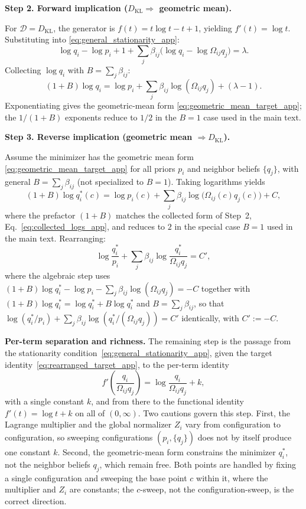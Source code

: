 \documentclass[11pt]{article}
\begin{document}
\textbf{Step 2. Forward implication ($D_{\mathrm{KL}}\Rightarrow$ geometric mean).}

For $\mathcal{D}=D_{\mathrm{KL}}$, the generator is $f(t)=t\log t - t + 1$, yielding $f'(t)=\log t$. Substituting into \eqref{eq:general_stationarity_app}:
\[
\log q_i - \log p_i + 1 + \sum_j \beta_{ij}\bigl(\log q_i - \log\Omega_{ij}q_j\bigr) = \lambda.
\]
Collecting $\log q_i$ with $B = \sum_j \beta_{ij}$:
\begin{equation}
(1+B)\log q_i = \log p_i + \sum_j\beta_{ij}\log(\Omega_{ij}q_j) + (\lambda - 1).
\label{eq:collected_logs_app}
\end{equation}
Exponentiating gives the geometric-mean form \eqref{eq:geometric_mean_target_app}; the $1/(1+B)$ exponents reduce to $1/2$ in the $B = 1$ case used in the main text.

\textbf{Step 3. Reverse implication (geometric mean $\Rightarrow D_{\mathrm{KL}}$).}

Assume the minimizer has the geometric mean form \eqref{eq:geometric_mean_target_app} for all priors $p_i$ and neighbor beliefs $\{q_j\}$, with general $B = \sum_j \beta_{ij}$ (not specialized to $B = 1$). Taking logarithms yields
\begin{equation}
(1+B)\log q_i^*(c) = \log p_i(c) + \sum_j\beta_{ij}\log\bigl(\Omega_{ij}(c)q_j(c)\bigr) + C,
\end{equation}
where the prefactor $(1+B)$ matches the collected form of Step~2, Eq.~\eqref{eq:collected_logs_app}, and reduces to $2$ in the special case $B = 1$ used in the main text. Rearranging:
\begin{equation}
\log\frac{q_i^*}{p_i} + \sum_j\beta_{ij}\log\frac{q_i^*}{\Omega_{ij}q_j} = C',
\label{eq:rearranged_target_app}
\end{equation}
where the algebraic step uses $(1+B)\log q_i^* - \log p_i - \sum_j\beta_{ij}\log(\Omega_{ij}q_j) = -C$ together with $(1+B)\log q_i^* = \log q_i^* + B\log q_i^*$ and $B = \sum_j\beta_{ij}$, so that $\log(q_i^*/p_i) + \sum_j\beta_{ij}\log(q_i^*/(\Omega_{ij}q_j)) = C'$ identically, with $C' := -C$.

\textbf{Per-term separation and richness.} The remaining step is the passage from the stationarity condition~\eqref{eq:general_stationarity_app}, given the target identity~\eqref{eq:rearranged_target_app}, to the per-term identity
\begin{equation}
f'\left(\frac{q_i}{\Omega_{ij}q_j}\right) = \log\frac{q_i}{\Omega_{ij}q_j} + k,
\label{eq:ode_app}
\end{equation}
with a single constant $k$, and from there to the functional identity $f'(t) = \log t + k$ on all of $(0, \infty)$. Two cautions govern this step. First, the Lagrange multiplier and the global normalizer $Z_i$ vary from configuration to configuration, so sweeping configurations $(p_i, \{q_j\})$ does not by itself produce one constant $k$. Second, the geometric-mean form constrains the minimizer $q_i^*$, not the neighbor beliefs $q_j$, which remain free. Both points are handled by fixing a single configuration and sweeping the base point $c$ within it, where the multiplier and $Z_i$ are constants; the $c$-sweep, not the configuration-sweep, is the correct direction.
\end{document}
